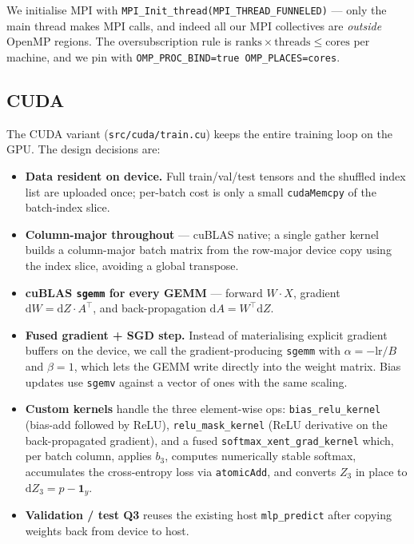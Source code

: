 \documentclass[11pt,a4paper]{article}
\begin{document}
\noindent We initialise MPI with
\verb|MPI_Init_thread(MPI_THREAD_FUNNELED)| --- only the main thread makes
MPI calls, and indeed all our MPI collectives are \emph{outside} OpenMP
regions. The oversubscription rule is
\(\mathrm{ranks}\times\mathrm{threads} \le \mathrm{cores}\) per machine, and
we pin with \verb|OMP_PROC_BIND=true OMP_PLACES=cores|.

\subsection{CUDA}\label{sec:cuda}

The CUDA variant (\texttt{src/cuda/train.cu}) keeps the entire training
loop on the GPU. The design decisions are:

\begin{itemize}[noitemsep,topsep=2pt]
  \item \textbf{Data resident on device.} Full train/val/test tensors and
  the shuffled index list are uploaded once; per-batch cost is only a
  small \texttt{cudaMemcpy} of the batch-index slice.
  \item \textbf{Column-major throughout} --- cuBLAS native; a single
  gather kernel builds a column-major batch matrix from the row-major
  device copy using the index slice, avoiding a global transpose.
  \item \textbf{cuBLAS \texttt{sgemm} for every GEMM} --- forward
  $W\cdot X$, gradient $\mathrm{d}W = \mathrm{d}Z\cdot A^\top$, and
  back-propagation $\mathrm{d}A = W^\top \mathrm{d}Z$.
  \item \textbf{Fused gradient + SGD step.} Instead of materialising
  explicit gradient buffers on the device, we call the
  gradient-producing \texttt{sgemm} with
  \(\alpha = -\mathrm{lr}/B\) and \(\beta=1\), which lets the GEMM write
  directly into the weight matrix. Bias updates use \texttt{sgemv}
  against a vector of ones with the same scaling.
  \item \textbf{Custom kernels} handle the three element-wise ops:
  \texttt{bias\_relu\_kernel} (bias-add followed by ReLU),
  \texttt{relu\_mask\_kernel} (ReLU derivative on the back-propagated
  gradient), and a fused \texttt{softmax\_xent\_grad\_kernel} which, per
  batch column, applies $b_3$, computes numerically stable softmax,
  accumulates the cross-entropy loss via \texttt{atomicAdd}, and
  converts $Z_3$ in place to $\mathrm{d}Z_3 = p - \mathbf{1}_y$.
  \item \textbf{Validation / test Q3} reuses the existing host
  \texttt{mlp\_predict} after copying weights back from device to host.
\end{itemize}
\end{document}
